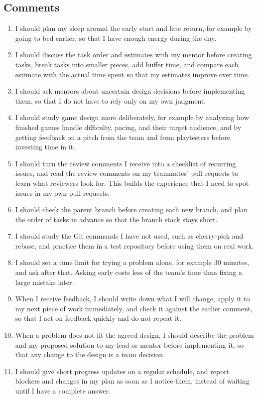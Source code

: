 \subsection{Comments}
\begin{enumerate}[label=\arabic*.]
    \item I should plan my sleep around the early start and late return, for example by going to bed earlier, so that I have enough energy during the day.
    \item I should discuss the task order and estimates with my mentor before creating tasks, break tasks into smaller pieces, add buffer time, and compare each estimate with the actual time spent so that my estimates improve over time.
    \item I should ask mentors about uncertain design decisions before implementing them, so that I do not have to rely only on my own judgment.
    \item I should study game design more deliberately, for example by analyzing how finished games handle difficulty, pacing, and their target audience, and by getting feedback on a pitch from the team and from playtesters before investing time in it.
    \newpage
    \item I should turn the review comments I receive into a checklist of recurring issues, and read the review comments on my teammates' pull requests to learn what reviewers look for. This builds the experience that I need to spot issues in my own pull requests.
    \item I should check the parent branch before creating each new branch, and plan the order of tasks in advance so that the branch stack stays short.
    \item I should study the Git commands I have not used, such as cherry-pick and rebase, and practice them in a test repository before using them on real work.
    \item I should set a time limit for trying a problem alone, for example 30 minutes, and ask after that. Asking early costs less of the team's time than fixing a large mistake later.
    \item When I receive feedback, I should write down what I will change, apply it to my next piece of work immediately, and check it against the earlier comment, so that I act on feedback quickly and do not repeat it.
    \item When a problem does not fit the agreed design, I should describe the problem and my proposed solution to my lead or mentor before implementing it, so that any change to the design is a team decision.
    \item I should give short progress updates on a regular schedule, and report blockers and changes in my plan as soon as I notice them, instead of waiting until I have a complete answer.
\end{enumerate}

